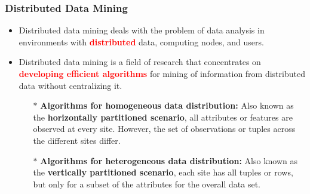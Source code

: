 \documentclass{beamer} %
\newcommand{\red}[1]{\textcolor{red}{#1}}
\begin{document}
\begin{frame}
\frametitle{Distributed Data Mining}
\begin{itemize} \itemsep2pt \parskip0pt 
    \item Distributed data mining deals with the problem of data analysis in environments with \red{\bf distributed} data, computing nodes, and users.
    \item Distributed data mining is a field of research that concentrates on \red{\bf developing efficient algorithms} for mining of information from distributed data without centralizing it.
    \begin{itemize} \itemsep2pt \parskip0pt 
        \item[$\ast$] {\bf Algorithms for homogeneous data distribution:} \newline Also known as the {\bf horizontally partitioned scenario}, all attributes or features are observed at every site. However, the set of observations or tuples across the different sites differ.
        \item[$\ast$] {\bf Algorithms for heterogeneous data distribution:} \newline Also known as the {\bf vertically partitioned scenario}, each site has all tuples or rows, but only for a subset of the attributes for the overall data set.
    \end{itemize}
\end{itemize}



\end{frame}
\end{document}

